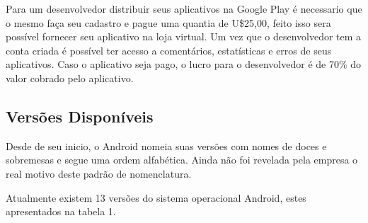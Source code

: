 Para um desenvolvedor distribuir seus aplicativos na Google Play é necessario que o mesmo faça seu cadastro e pague uma quantia de U\$25,00, feito isso
sera possível fornecer seu aplicativo na loja virtual.
Um vez que o desenvolvedor tem a conta criada é possível ter acesso a comentários, estatísticas e erros de seus aplicativos. Caso o aplicativo seja pago, o lucro para o desenvolvedor é de 70\% do valor cobrado pelo aplicativo. \cite{tt}

\subsection{Versões Disponíveis}

Desde de seu inicio, o Android nomeia suas versões com nomes de doces e sobremesas e segue uma ordem alfabética. Ainda não foi revelada pela empresa o real motivo deste padrão de nomenclatura.

Atualmente existem 13 versões do sistema operacional Android, estes apresentados na tabela 1. \cite{vs}

\begin{table}[h!]
\end{table}
\pagebreak
